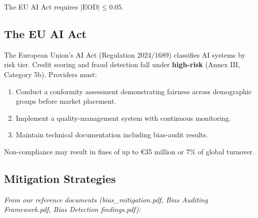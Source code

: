 \documentclass[conference]{IEEEtran}
\begin{document}
The EU AI Act requires $|\mathrm{EOD}| \leq 0.05$.

\subsection{The EU AI Act}

The European Union's AI Act (Regulation 2024/1689) classifies AI systems by risk tier. Credit scoring and fraud detection fall under \textbf{high-risk} (Annex III, Category 5b). Providers must:

\begin{enumerate}
\item Conduct a conformity assessment demonstrating fairness across
   demographic groups before market placement.
\item Implement a quality-management system with continuous monitoring.
\item Maintain technical documentation including bias-audit results.
\end{enumerate}

Non-compliance may result in fines of up to €35 million or 7\% of global turnover.

\subsection{Mitigation Strategies}

\textit{From our reference documents (bias\_mitigation.pdf, Bias Auditing Framework.pdf, Bias Detection findings.pdf):}
\end{document}
